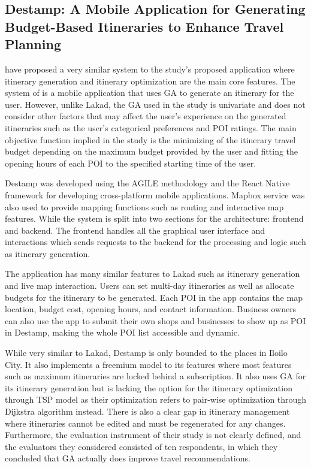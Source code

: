 \subsection{Destamp: A Mobile Application for Generating Budget-Based Itineraries to Enhance Travel Planning}

\textcite{Estilo2023} have proposed a very similar system to the study’s proposed application where itinerary generation and itinerary optimization are the main core features. The system of \textcite{Estilo2023} is a mobile application that uses GA to generate an itinerary for the user. However, unlike Lakad, the GA used in the study is univariate and does not consider other factors that may affect the user’s experience on the generated itineraries such as the user’s categorical preferences and POI ratings. The main objective function implied in the study is the minimizing of the itinerary travel budget depending on the maximum budget provided by the user and fitting the opening hours of each POI to the specified starting time of the user.

Destamp was developed using the AGILE methodology and the React Native framework for developing cross-platform mobile applications. Mapbox service was also used to provide mapping functions such as routing and interactive map features. While the system is split into two sections for the architecture: frontend and backend. The frontend handles all the graphical user interface and interactions which sends requests to the backend for the processing and logic such as itinerary generation.

The application has many similar features to Lakad such as itinerary generation and live map interaction. Users can set multi-day itineraries as well as allocate budgets for the itinerary to be generated. Each POI in the app contains the map location, budget cost, opening hours, and contact information. Business owners can also use the app to submit their own shops and businesses to show up as POI in Destamp, making the whole POI list accessible and dynamic.

While very similar to Lakad, Destamp is only bounded to the places in Iloilo City. It also implements a freemium model to its features where most features such as maximum itineraries are locked behind a subscription. It also uses GA for its itinerary generation but is lacking the option for the itinerary optimization through TSP model as their optimization refers to pair-wise optimization through Dijkstra algorithm instead. There is also a clear gap in itinerary management where itineraries cannot be edited and must be regenerated for any changes. Furthermore, the evaluation instrument of their study is not clearly defined, and the evaluators they considered consisted of ten respondents, in which they concluded that GA actually does improve travel recommendations.

